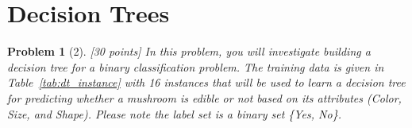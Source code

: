 \documentclass[11pt]{article}
\theoremstyle{quest}
\newtheorem*{problem}{Problem}
\begin{document}
\section*{Decision Trees}
\begin{problem}[2] [30 points]
In this problem, you will investigate building a decision tree for a binary classification problem. The training data is given in Table~\ref{tab:dt_instance} with 16 instances that will be used to learn a decision tree for predicting whether a mushroom is edible or not based on its attributes (\textsf{Color}, \textsf{Size}, and \textsf{Shape}). Please note the label set is a binary set \textsf{\{Yes, No\}}.

\begin{table}[t!]
\centering
{}
\caption{Mushroom data with 16 instances, three categorical features, and binary labels.}
\label{tab:dt_instance}
\end{table}


\end{problem}
\end{document}
